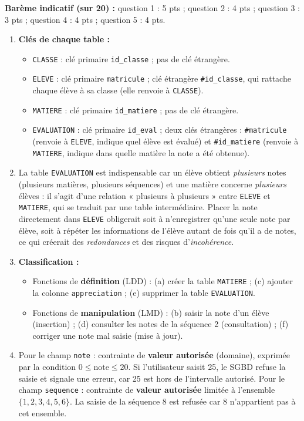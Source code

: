 \documentclass[11pt]{article}
\begin{document}
\begin{corrige}
\textbf{Barème indicatif (sur 20) :} question 1 : 5 pts ; question 2 : 4 pts ; question 3 : 3 pts ; question 4 : 4 pts ; question 5 : 4 pts.

\begin{enumerate}
\item \textbf{Clés de chaque table :}
\begin{itemize}
\item \texttt{CLASSE} : clé primaire \texttt{id\_classe} ; pas de clé étrangère.
\item \texttt{ELEVE} : clé primaire \texttt{matricule} ; clé étrangère \texttt{\#id\_classe}, qui rattache chaque élève à sa classe (elle renvoie à \texttt{CLASSE}).
\item \texttt{MATIERE} : clé primaire \texttt{id\_matiere} ; pas de clé étrangère.
\item \texttt{EVALUATION} : clé primaire \texttt{id\_eval} ; deux clés étrangères : \texttt{\#matricule} (renvoie à \texttt{ELEVE}, indique quel élève est évalué) et \texttt{\#id\_matiere} (renvoie à \texttt{MATIERE}, indique dans quelle matière la note a été obtenue).
\end{itemize}
\item La table \texttt{EVALUATION} est indispensable car un élève obtient \emph{plusieurs} notes (plusieurs matières, plusieurs séquences) et une matière concerne \emph{plusieurs} élèves : il s'agit d'une relation « plusieurs à plusieurs » entre \texttt{ELEVE} et \texttt{MATIERE}, qui se traduit par une table intermédiaire. Placer la note directement dans \texttt{ELEVE} obligerait soit à n'enregistrer qu'une seule note par élève, soit à répéter les informations de l'élève autant de fois qu'il a de notes, ce qui créerait des \emph{redondances} et des risques d'\emph{incohérence}.
\item \textbf{Classification :}
\begin{itemize}
\item Fonctions de \textbf{définition} (LDD) : (a) créer la table \texttt{MATIERE} ; (c) ajouter la colonne \texttt{appreciation} ; (e) supprimer la table \texttt{EVALUATION}.
\item Fonctions de \textbf{manipulation} (LMD) : (b) saisir la note d'un élève (insertion) ; (d) consulter les notes de la séquence 2 (consultation) ; (f) corriger une note mal saisie (mise à jour).
\end{itemize}
\item Pour le champ \texttt{note} : contrainte de \textbf{valeur autorisée} (domaine), exprimée par la condition $0 \leq \text{note} \leq 20$. Si l'utilisateur saisit 25, le SGBD refuse la saisie et signale une erreur, car 25 est hors de l'intervalle autorisé. Pour le champ \texttt{sequence} : contrainte de \textbf{valeur autorisée} limitée à l'ensemble $\{1, 2, 3, 4, 5, 6\}$. La saisie de la séquence 8 est refusée car 8 n'appartient pas à cet ensemble.

\end{enumerate}
\end{corrige}
\end{document}
